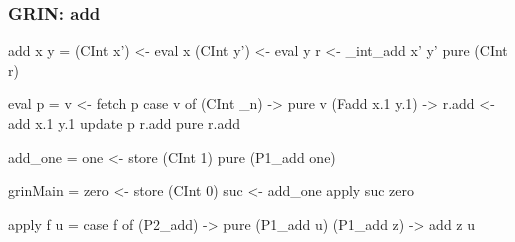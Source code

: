 \documentclass[bigger,aspectratio=169]{beamer}
\begin{document}
\begin{frame}[fragile]
\frametitle{GRIN: add}

\begin{center}
	
	\vspace{0.4cm}
	\begin{minipage}{0.45\textwidth}
		\begin{haskellcode}
			add x y =
			 (CInt x') <- eval x
			 (CInt y') <- eval y
			 r <- _int_add x' y'
			 pure (CInt r)
		\end{haskellcode}
		\pause
		\begin{haskellcode}
			eval p =
			 v <- fetch p
			 case v of
			  (CInt _n) -> pure v
			  (Fadd x.1 y.1) ->
			   r.add <- add x.1 y.1
			   update p r.add
			   pure r.add
		\end{haskellcode}
	\end{minipage}
	\hfill
	\pause
	\begin{minipage}{0.50\textwidth}
		\begin{haskellcode}
			add_one =
			 one <- store (CInt 1)
			 pure (P1_add one)
		\end{haskellcode}
		\pause
		\begin{haskellcode}
			grinMain =
			 zero <- store (CInt 0)
			 suc <- add_one
			 apply suc zero
		\end{haskellcode}
		\vfill
		\pause
		\begin{haskellcode}
			apply f u =
			 case f of
			  (P2_add) ->
			   pure (P1_add u)
			  (P1_add z) -> add z u
		\end{haskellcode}
	\end{minipage}

\end{center}
\end{frame}
\end{document}
